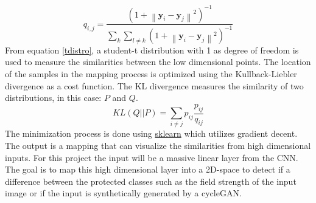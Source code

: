 \documentclass[12pt, fleqn, titlepage]{article}
\newcommand{\norm}[1]{\left\lVert#1\right\rVert}
\newcommand{\1}[1]{\mathds{1}\left[#1\right]}
\begin{document}
\begin{equation}\label{tdistro}
	q_{i,j} = \frac{(1 + \norm{\mathbf y_i - \mathbf y_j}^2)^{-1}}{\sum_k \sum_{l \neq k}(1 + \norm{\mathbf y_i - \mathbf y_j}^2)^{-1}}
\end{equation}
From equation \eqref{tdistro}, a student-t distribution with 1 as degree of freedom is used to measure the similarities between the low dimensional points. 
The location of the samples in the mapping process is optimized using the Kullback-Liebler divergence as a cost function. The KL divergence measures the similarity of two distributions, in this case: $ P $ and $ Q $. 
\begin{equation*}\label{key}
	KL(Q \vert \vert P) = \sum_{i \neq j} p_{ij} \frac{p_{ij}}{q_{ij}}
\end{equation*} 
The minimization process is done using \href{https://scikit-learn.org/stable/modules/generated/sklearn.manifold.TSNE.html}{sklearn} which utilizes gradient decent. The output is a mapping that can visualize the similarities from high dimensional inputs. For this project the input will be a massive linear layer from the CNN. The goal is to map this high dimensional layer into a 2D-space to detect if a difference between the protected classes such as the field strength of the input image or if the input is synthetically generated by a cycleGAN.
\end{document}

